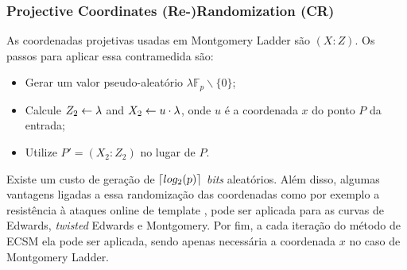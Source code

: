 \subsubsection{Projective Coordinates (Re-)Randomization (CR)~\cite{Coron1999}}
As coordenadas projetivas usadas em Montgomery Ladder são $(X : Z)$. Os passos para aplicar essa contramedida são:
\begin{itemize}
    \item Gerar um valor pseudo-aleatório $\lambda \mathbb{F}_p \backslash \{0\}$;
    \item Calcule $Z_2 \leftarrow \lambda$ and $X_2 \leftarrow u \cdot \lambda$, onde $u$ é a coordenada $x$ do ponto $P$ da entrada;
    \item Utilize $P'=(X_2:Z_2)$ no lugar de $P$.
\end{itemize}

Existe um custo de geração de $\lceil log_2(p)\rceil$ \textit{bits} aleatórios. Além disso, algumas vantagens ligadas a essa randomização das coordenadas como por exemplo a resistência à ataques online de template \cite{BatinaChmielewski2014}, pode ser aplicada para as curvas de Edwards, \textit{twisted} Edwards e Montgomery. Por fim, a cada iteração do método de ECSM ela pode ser aplicada, sendo apenas necessária a coordenada $x$ no caso de Montgomery Ladder.

